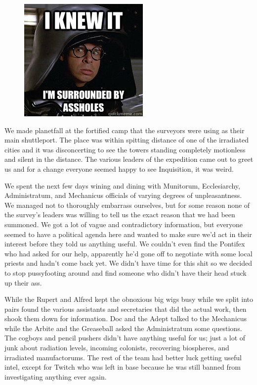 \begin{figure}
	\begin{center}
		\includegraphics[width=\figwidth]{pics/6/5.png}
	\end{center}
\end{figure}
We made planetfall at the fortified camp that the surveyors were using as their main shuttleport. 
The place was within spitting distance of one of the irradiated cities and it was disconcerting to see the towers standing completely motionless and silent in the distance. 
The various leaders of the expedition came out to greet us and for a change everyone seemed happy to see Inquisition, it was weird. 

We spent the next few days wining and dining with Munitorum, Ecclesiarchy, Administratum, and Mechanicus officials of varying degrees of unpleasantness. 
We managed not to thoroughly embarrass ourselves, but for some reason none of the survey's leaders was willing to tell us the exact reason that we had been summoned.
We got a lot of vague and contradictory information, but everyone seemed to have a political agenda here and wanted to make sure we'd act in their interest before they told us anything useful. 
We couldn't even find the Pontifex who had asked for our help, apparently he'd gone off to negotiate with some local priests and hadn't come back yet. 
We didn't have time for this shit so we decided to stop pussyfooting around and find someone who didn't have their head stuck up their ass.

While the Rupert and Alfred kept the obnoxious big wigs busy while we split into pairs found the various assistants and secretaries that did the actual work, then shook them down for information. 
Doc and the Adept talked to the Mechanicus while the Arbite and the Greaseball asked the Administratum some questions. 
The cogboys and pencil pushers didn't have anything useful for us; just a lot of junk about radiation levels, incoming colonists, recovering biospheres, and irradiated manufactorums. 
The rest of the team had better luck getting useful intel, except for Twitch who was left in base because he was still banned from investigating anything ever again.

